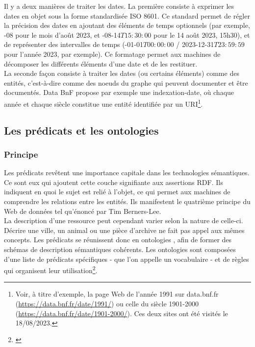 \documentclass[a4paper,12pt,twoside]{book}
\begin{document}
Il y a deux manières de traiter les dates. La première consiste à exprimer les dates en objet sous la forme standardisée ISO 8601. Ce standard permet de régler la précision des dates en ajoutant des éléments de temps optionnels (par exemple, -08 \fg{} pour le mois d'août 2023, et -08-14{$T15{:}30{:}00$} \fg{} pour le 14 août 2023, 15h30), et de représenter des intervalles de temps (-01-01{$T00{:}00{:}00$} / 2023-12-31{$T23{:}59{:}59$} \fg{} pour l'année 2023, par exemple). Ce formatage permet aux machines de décomposer les différents éléments d'une date et de les restituer.\\

La seconde façon consiste à traiter les dates (ou certains éléments) comme des entités, c'est-à-dire comme des noeuds du graphe qui peuvent documenter et être documentés. Data BnF propose par exemple une indexation-date, où chaque année et chaque siècle constitue une entité identifiée par un URI\footnote{Voir, à titre d'exemple, la page Web de l'année 1991 sur data.bnf.fr (\url{https://data.bnf.fr/date/1991/}) ou celle du siècle 1901-2000 (\url{https://data.bnf.fr/date/1901-2000/}). Ces deux sites ont été visités le 18/08/2023.}.


\subsection{Les prédicats et les ontologies}
\subsubsection{Principe}
Les prédicats revêtent une importance capitale dans les technologies sémantiques. Ce sont eux qui ajoutent cette couche signifiante aux assertions RDF. Ils indiquent en quoi le sujet est relié à l'objet, ce qui permet aux machines de \og comprendre \fg{} les relations entre les entités. Ils manifestent le quatrième principe du Web de données tel qu'énoncé par Tim Berners-Lee.\\

La description d'une ressource peut cependant varier selon la nature de celle-ci. Décrire une ville, un animal ou une pièce d'archive ne fait pas appel aux mêmes concepts. Les prédicats se réunissent donc en \og ontologies \fg, afin de former des schémas de description sémantiques cohérents. Les ontologies sont composées d'une liste de prédicats spécifiques - que l'on appelle un \og vocabulaire \fg{} - et de règles qui organisent leur utilisation\footnote{\cite[p.~6]{uscholdOntologiesPrinciplesMethods1996}}.\\
\end{document}
